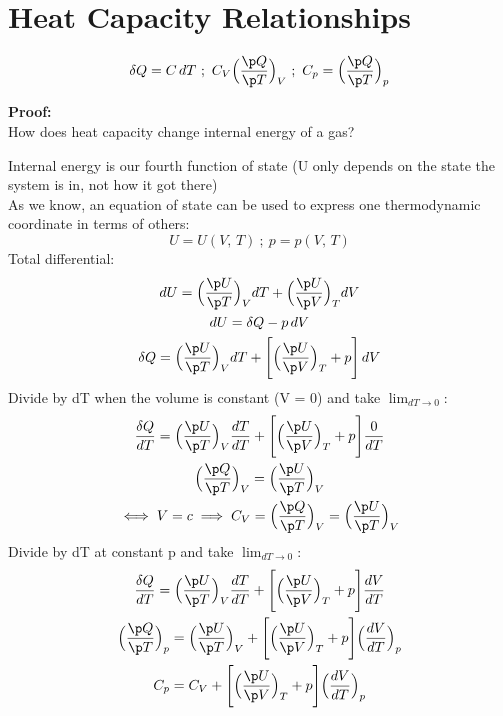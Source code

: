 \documentclass[a4paper, 11pt, normalem]{report}
\begin{document}
\section{Heat Capacity Relationships}
\begin{equation*}
    \delta Q = C\,dT ~;~ C_{V} \Big(\frac{\p Q}{\p T}\Big)_{V} ~;~ C_{p} = \Big(\frac{\p Q}{\p T} \Big)_{p}
\end{equation*}

\textbf{Proof:}\\
How does heat capacity change internal energy of a gas?

Internal energy is our fourth function of state (U only depends on the state the system is in, not how it got there) \\
As we know, an equation of state can be used to express one thermodynamic coordinate in terms of others:
\begin{equation*}
    U = U(V,\,T) ~;~ p = p(V,\,T)
\end{equation*}
Total differential:
\begin{gather*}
    dU = \Big(\frac{\p U}{\p T} \Big)_V dT + \Big(\frac{\p U}{\p V} \Big)_T dV \\
    dU = \delta Q - p\,dV \\
    \delta Q = \Big(\frac{\p U}{\p T} \Big)_V dT + \Bigg[\Big(\frac{\p U}{\p V} \Big)_T + p \Bigg]\,dV
\end{gather*}
Divide by dT when the volume is constant (V = 0) and take $\lim_{dT \to 0}$:
\begin{gather*}
    \frac{\delta Q}{dT} = \Big(\frac{\p U}{\p T} \Big)_{V} \frac{dT}{dT} + \Bigg[\Big(\frac{\p U}{\p V} \Big)_T + p \Bigg]\frac{0}{dT} \\
    \Big(\frac{\p Q}{\p T} \Big)_V = \Big(\frac{\p U}{\p T} \Big)_{V} \\
    \iff V = c \implies C_{V} = \Big(\frac{\p Q}{\p T} \Big)_{V} = \Big(\frac{\p U}{\p T} \Big)_{V}
\end{gather*}
Divide by dT at constant p and take $\lim_{dT \to 0}$:
\begin{gather*}
    \frac{\delta Q}{dT} = \Big(\frac{\p U}{\p T} \Big)_{V} \frac{dT}{dT} + \Bigg[\Big(\frac{\p U}{\p V} \Big)_T + p \Bigg]\frac{dV}{dT} \\
    \Big(\frac{\p Q}{\p T} \Big)_{p} = \Big(\frac{\p U}{\p T} \Big)_{V} + \Bigg[\Big(\frac{\p U}{\p V} \Big)_T + p \Bigg] \Big(\frac{dV}{dT} \Big)_{p} \\
    C_p = C_V + \Bigg[\Big(\frac{\p U}{\p V} \Big)_T + p \Bigg] \Big(\frac{dV}{dT} \Big)_{p}
\end{gather*}
\end{document}
